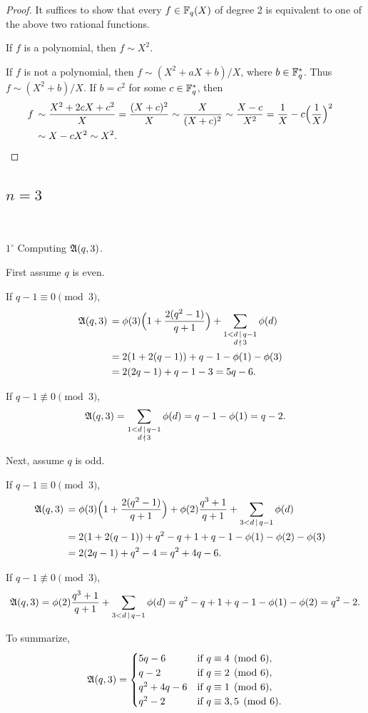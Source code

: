 \documentclass{amsart}
\numberwithin{equation}{section}
\theoremstyle{definition}
\newcommand{\f}{\Bbb F}
\begin{document}
\begin{proof}
It suffices to show that every $f\in\f_q(X)$ of degree 2 is equivalent to one of the above two rational functions.

If $f$ is a polynomial, then $f\sim X^2$.

If $f$ is not a polynomial, then $f\sim(X^2+aX+b)/X$, where $b\in\f_q^*$. Thus $f\sim(X^2+b)/X$. If $b=c^2$ for some $c\in\f_q^*$, then 
\begin{align*}
f\,&\sim\frac{X^2+2cX+c^2}X=\frac{(X+c)^2}X\sim\frac X{(X+c)^2}\sim\frac{X-c}{X^2}= \frac 1X-c\Bigl(\frac 1X\Bigr)^2\cr
&\sim X-cX^2\sim X^2.
\end{align*}
\end{proof} 

\subsection{$n=3$}\

$1^\circ$ Computing $\frak A(q,3)$.

\medskip
First assume $q$ is even.

If $q-1\equiv 0\pmod 3$, 
\begin{align*}
\frak A(q,3)\,&=\phi(3)\Bigl(1+\frac{2(q^2-1)}{q+1}\Bigr)+\sum_{\substack{1<d\,\mid\, q-1\cr d\,\nmid\, 3}}\phi(d)\cr
&=2(1+2(q-1))+q-1-\phi(1)-\phi(3)\cr
&=2(2q-1)+q-1-3=5q-6.
\end{align*}

If $q-1\not\equiv 0\pmod 3$,
\[
\frak A(q,3)=\sum_{\substack{1<d\,\mid\, q-1\cr d\,\nmid\, 3}}\phi(d)=q-1-\phi(1)=q-2.
\]

\medskip
Next, assume $q$ is odd.

If $q-1\equiv 0\pmod 3$,
\begin{align*}
\frak A(q,3)\,&=\phi(3)\Bigl(1+\frac {2(q^2-1)}{q+1}\Bigr)+\phi(2)\frac{q^3+1}{q+1}+\sum_{3<d\,\mid\, q-1}\phi(d)\cr
&=2(1+2(q-1))+q^2-q+1+q-1-\phi(1)-\phi(2)-\phi(3)\cr
&=2(2q-1)+q^2-4=q^2+4q-6.
\end{align*}

If $q-1\not\equiv 0\pmod 3$,
\[
\frak A(q,3)=\phi(2)\frac{q^3+1}{q+1}+\sum_{3<d\,\mid\, q-1}\phi(d)=q^2-q+1+q-1-\phi(1)-\phi(2)=q^2-2.
\]

To summarize,
\[
\frak A(q,3)=\begin{cases}
5q-6&\text{if}\ q\equiv 4\pmod 6,\cr
q-2&\text{if}\ q\equiv 2\pmod 6,\cr
q^2+4q-6&\text{if}\ q\equiv 1\pmod 6,\cr
q^2-2&\text{if}\ q\equiv 3,5\pmod 6.
\end{cases}
\]
\end{document}
